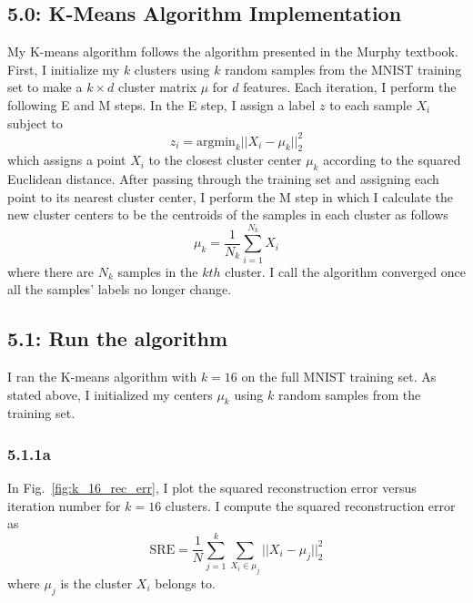 \documentclass[12pt]{amsart}
\begin{document}
\subsection*{5.0: K-Means Algorithm Implementation}

My K-means algorithm follows the algorithm presented in the Murphy textbook.  First, I initialize my $k$ clusters using $k$ random samples from the MNIST training set to make a $k \times d$ cluster matrix $\mu$ for $d$ features.  Each iteration, I perform the following E and M steps.  In the E step, I assign a label $z$ to each sample $X_i$ subject to
\begin{equation} \label{eqn:E_step}
z_i = \text{argmin}_k ||X_i - \mu_k ||_2^2
\end{equation}
which assigns a point $X_i$ to the closest cluster center $\mu_k$ according to the squared Euclidean distance.  After passing through the training set and assigning each point to its nearest cluster center, I perform the M step in which I calculate the new cluster centers to be the centroids of the samples in each cluster as follows
\begin{equation} \label{eqn:M_step}
\mu_k = \frac{1}{N_k} \sum_{i = 1}^{N_k} X_i
\end{equation}
where there are $N_k$ samples in the $kth$ cluster.  I call the algorithm converged once all the samples' labels no longer change.

\subsection*{5.1: Run the algorithm}

I ran the K-means algorithm with $k = 16$ on the full MNIST training set.  As stated above, I initialized my centers $\mu_k$ using $k$ random samples from the training set.

\subsubsection*{5.1.1a}

In Fig.~\ref{fig:k_16_rec_err}, I plot the squared reconstruction error versus iteration number for $k = 16$ clusters.  I compute the squared reconstruction error as
\begin{equation} \label{eqn:sq_rec_err}
\text{SRE} = \frac{1}{N} \sum_{j = 1}^k\sum_{X_i \in \mu_j} || X_i - \mu_j ||_2^2
\end{equation}
where $\mu_j$ is the cluster $X_i$ belongs to.
\end{document}
